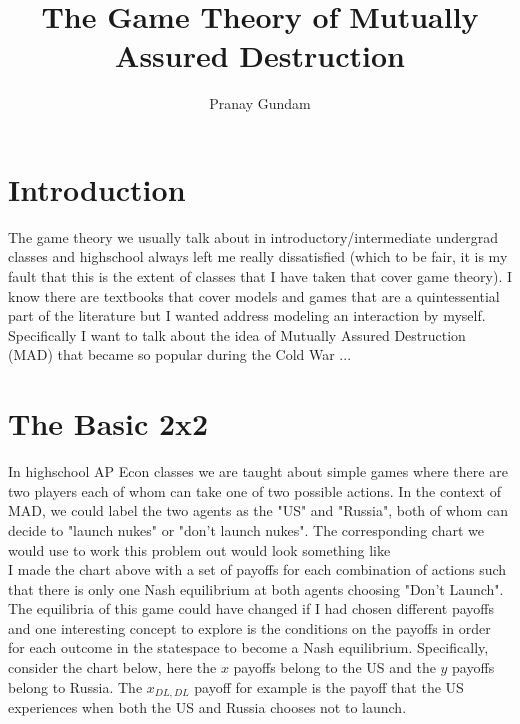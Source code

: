 \documentclass[11pt,english]{article}
\title{\textbf{The Game Theory of Mutually Assured Destruction}}
\author{Pranay Gundam}
\begin{document}
\maketitle

\section*{Introduction}

The game theory we usually talk about in introductory/intermediate undergrad classes and highschool always left me really dissatisfied (which to be fair, it is my fault that this is the extent of classes that I have taken that cover game theory). I know there are textbooks that cover models and games that are a quintessential part of the literature but I wanted address modeling an interaction by myself. Specifically I want to talk about the idea of Mutually Assured Destruction (MAD) that became so popular during the Cold War ...


\section*{The Basic 2x2}
In highschool AP Econ classes we are taught about simple games where there are two players each of whom can take one of two possible actions. In the context of MAD, we could label the two agents as the "US" and "Russia", both of whom can decide to "launch nukes" or "don't launch nukes". The corresponding chart we would use to work this problem out would look something like \\



\noindent I made the chart above with a set of payoffs for each combination of actions such that there is only one Nash equilibrium at both agents choosing "Don't Launch". The equilibria of this game could have changed if I had chosen different payoffs and one interesting concept to explore is the conditions on the payoffs in order for each outcome in the statespace to become a Nash equilibrium. Specifically, consider the chart below, here the $x$ payoffs belong to the US and the $y$ payoffs belong to Russia. The $x_{DL,DL}$ payoff for example is the payoff that the US experiences when both the US and Russia chooses not to launch.\\
\end{document}
